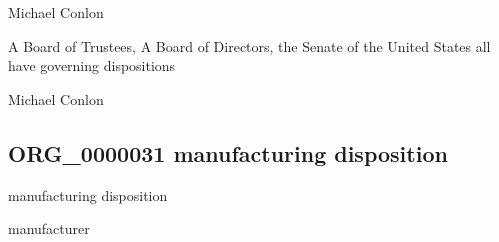 \documentclass[letterpaper,10pt,english]{sphinxmanual}
\begin{document}
\begin{sphinxShadowBox}

\sphinxAtStartPar
Michael Conlon 
\end{sphinxShadowBox}

\begin{sphinxShadowBox}

\sphinxAtStartPar
A Board of Trustees, A Board of Directors, the Senate of the United States all have governing dispositions
\end{sphinxShadowBox}

\begin{sphinxShadowBox}

\sphinxAtStartPar
Michael Conlon 
\end{sphinxShadowBox}
\begin{quote}

\ignorespaces \end{quote}


\subsection{ORG\_0000031 \sphinxhyphen{} manufacturing disposition}
\label{\detokenize{doc-ORG_0000031:org-0000031-manufacturing-disposition}}\label{\detokenize{doc-ORG_0000031:index-0}}\label{\detokenize{doc-ORG_0000031::doc}}
\begin{sphinxShadowBox}

\sphinxAtStartPar
manufacturing disposition
\end{sphinxShadowBox}

\begin{sphinxShadowBox}

\sphinxAtStartPar
manufacturer
\end{sphinxShadowBox}

\begin{sphinxShadowBox}

\sphinxAtStartPar
{\hyperref[\detokenize{doc-BFO_0000016::doc}]{}}
\end{sphinxShadowBox}
\end{document}
